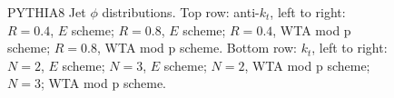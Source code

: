 \begin{figure}[H]
\hfill
{}\hfill
{}\hfill
\caption{PYTHIA8 Jet $\phi$ distributions. Top row: anti-$k_t$, left to right: $R=0.4$, $E$ scheme; $R=0.8$, $E$ scheme; $R=0.4$, WTA mod p scheme; $R=0.8$, WTA mod p scheme. Bottom row: $k_t$, left to right: $N=2$, $E$ scheme; $N=3$, $E$ scheme; $N=2$, WTA mod p scheme; $N=3$; WTA mod p scheme.}  
\end{figure}

